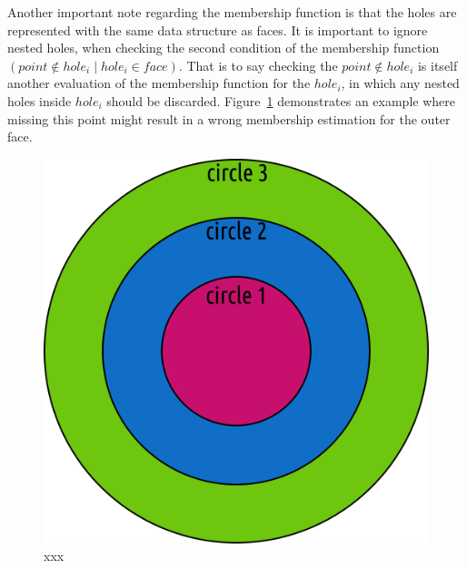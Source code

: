 Another important note regarding the membership function is that the holes are represented with the same data structure as faces.
It is important to ignore nested holes, when checking the second condition of the membership function $\left(point \notin hole_i \mid hole_i \in face\right)$.
That is to say checking the $point \notin hole_i$ is itself another evaluation of the membership function for the $hole_i$, in which any nested holes inside $hole_i$ should be discarded.
Figure~\ref{fig:disc_specialCase2} demonstrates an example where missing this point might result in a wrong membership estimation for the outer face.

\begin{figure} %
    \centering
    \includegraphics[width=.3\textwidth]{figures/disc_specialCase2.png}
    \caption{xxx}
    \label{fig:disc_specialCase2}
\end{figure}
